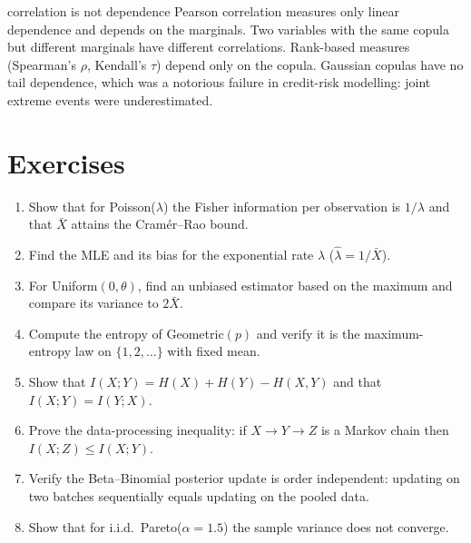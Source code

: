 \begin{pitfall}{correlation is not dependence}
Pearson correlation measures only linear dependence and depends on the marginals. Two variables with the
same copula but different marginals have different correlations. Rank-based measures (Spearman's
$\rho$, Kendall's $\tau$) depend only on the copula. Gaussian copulas have no tail dependence,
which was a notorious failure in credit-risk modelling: joint extreme events were underestimated.
\end{pitfall}

\section*{Exercises}

\begin{enumerate}
\item Show that for Poisson($\lambda$) the Fisher information per observation is $1/\lambda$ and that
$\bar X$ attains the Cram\'er--Rao bound.
\item Find the MLE and its bias for the exponential rate $\lambda$ ($\hat\lambda=1/\bar X$).
\item For Uniform$(0,\theta)$, find an unbiased estimator based on the maximum and compare its
variance to $2\bar X$.
\item Compute the entropy of Geometric$(p)$ and verify it is the maximum-entropy law on $\{1,2,\dots\}$ with
fixed mean.
\item Show that $I(X;Y)=H(X)+H(Y)-H(X,Y)$ and that $I(X;Y)=I(Y;X)$.
\item Prove the data-processing inequality: if $X\to Y\to Z$ is a Markov chain then $I(X;Z)\le I(X;Y)$.
\item Verify the Beta--Binomial posterior update is order independent: updating on two batches
sequentially equals updating on the pooled data.
\item Show that for i.i.d.\ Pareto($\alpha=1.5$) the sample variance does not converge.
\end{enumerate}
